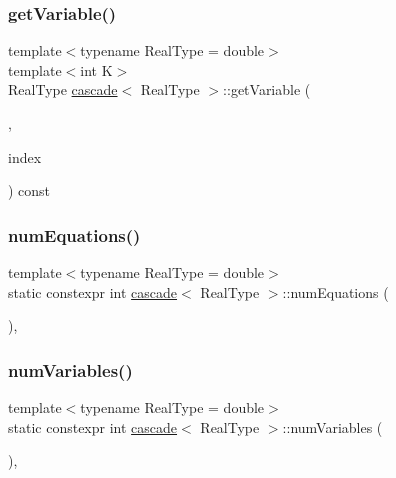 \subsubsection{\texorpdfstring{get\+Variable()}{getVariable()}}
{\footnotesize\ttfamily template$<$typename Real\+Type = double$>$ \\
template$<$int K$>$ \\
Real\+Type \mbox{\hyperlink{classcascade}{cascade}}$<$ Real\+Type $>$\+::get\+Variable (\begin{DoxyParamCaption}\item[{Var\+Group$<$ K $>$}]{,  }\item[{const int}]{index }\end{DoxyParamCaption}) const\hspace{0.3cm}{\ttfamily [inline]}}

\mbox{\label{classcascade_a9c6e6421737df16249a7198e8feda747}} 
\subsubsection{\texorpdfstring{num\+Equations()}{numEquations()}}
{\footnotesize\ttfamily template$<$typename Real\+Type = double$>$ \\
static constexpr int \mbox{\hyperlink{classcascade}{cascade}}$<$ Real\+Type $>$\+::num\+Equations (\begin{DoxyParamCaption}\item[{Eq\+Group$<$ 0 $>$ \&}]{ }\end{DoxyParamCaption})\hspace{0.3cm}{\ttfamily [inline]}, {\ttfamily [static]}}

\mbox{\label{classcascade_a437738f915a517f4fb76a848e94ec923}} 
\subsubsection{\texorpdfstring{num\+Variables()}{numVariables()}}
{\footnotesize\ttfamily template$<$typename Real\+Type = double$>$ \\
static constexpr int \mbox{\hyperlink{classcascade}{cascade}}$<$ Real\+Type $>$\+::num\+Variables (\begin{DoxyParamCaption}\item[{Var\+Group$<$ 0 $>$ \&}]{ }\end{DoxyParamCaption})\hspace{0.3cm}{\ttfamily [inline]}, {\ttfamily [static]}}

